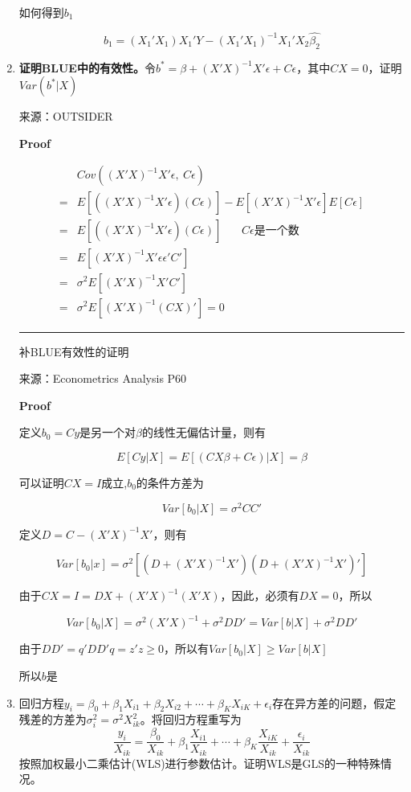\documentclass{article}
\begin{document}
\begin{enumerate}
        如何得到$b_1$

        $$
          b_1 = (X_1'X_1)X_1'Y-(X_1'X_1)^{-1}X_1'X_2\widehat{\beta_2}
        $$

    \item \textbf{证明BLUE中的有效性。}令$b^{*}=\beta+(X'X)^{-1}X'\epsilon+C\epsilon$，其中$CX=0$，证明$Var(b^*|X)$

    来源：OUTSIDER

    \textbf{Proof}

    $$
      \begin{aligned}
        &Cov((X'X)^{-1}X'\epsilon,\ C\epsilon) \\
        = &E[((X'X)^{-1}X'\epsilon)(C\epsilon)] - E[(X'X)^{-1}X'\epsilon]E[C\epsilon] \\
        = &E[((X'X)^{-1}X'\epsilon)(C\epsilon)] \ \ \ \ \ \ \ \ C\epsilon\text{是一个数}\\
        = &E[(X'X)^{-1}X'\epsilon\epsilon'C'] \\
        = &\sigma^2E[(X'X)^{-1}X'C'] \\
        = &\sigma^2E[(X'X)^{-1}(CX)'] = 0
      \end{aligned}
    $$

    \noindent\rule{\textwidth}{0.4pt}

    补BLUE有效性的证明

    来源：Econometrics Analysis P60

    \textbf{Proof}

    定义$b_0=Cy$是另一个对$\beta$的线性无偏估计量，则有

    $$
    E[Cy|X] = E[(CX\beta+C\epsilon)|X] = \beta
    $$

    可以证明$CX=I$成立,$b_0$的条件方差为

    $$
    Var[b_0|X] = \sigma^2CC'
    $$

    定义$D=C-(X'X)^{-1}X'$，则有

    $$
    Var[b_0|x] = \sigma^2[(D+(X'X)^{-1}X')(D+(X'X)^{-1}X')']
    $$

    由于$CX=I=DX+(X'X)^{-1}(X'X)$，因此，必须有$DX=0$，所以

    $$
    Var[b_0|X] = \sigma^2(X'X)^{-1}+\sigma^2DD'=Var[b|X]+\sigma^2DD'
    $$

    由于$DD'=q'DD'q=z'z\ge 0$，所以有$Var[b_0|X] \ge Var[b|X]$

    所以$b$是

    \item 回归方程$y_i=\beta_0+\beta_1X_{i1}+\beta_2X_{i2}+\cdots+\beta_KX_{iK}+\epsilon_i$存在异方差的问题，假定残差的方差为$\sigma_i^2=\sigma^2X_{ik}^2$。将回归方程重写为
    $$
      \frac{y_i}{X_{ik}}=\frac{\beta_0}{X_{ik}}+\beta_1\frac{X_{i1}}{X_{ik}}+\cdots+\beta_K\frac{X_{iK}}{X_{ik}}+\frac{\epsilon_i}{X_{ik}}
    $$
    按照加权最小二乘估计(WLS)进行参数估计。证明WLS是GLS的一种特殊情况。


\end{enumerate}
\end{document}
